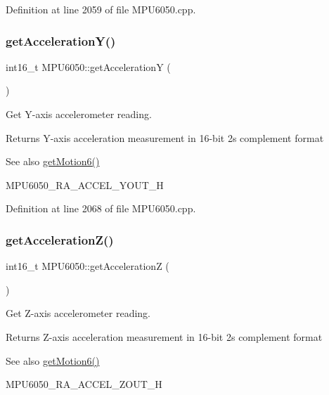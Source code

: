 Definition at line 2059 of file M\+P\+U6050.\+cpp.

\mbox{\label{classMPU6050_a27240b90d3e03c85b7a619b794bb1756}} 
\subsubsection{\texorpdfstring{getAccelerationY()}{getAccelerationY()}}
{\footnotesize\ttfamily int16\+\_\+t M\+P\+U6050\+::get\+AccelerationY (\begin{DoxyParamCaption}{ }\end{DoxyParamCaption})}



Get Y-\/axis accelerometer reading. 

\begin{DoxyReturn}{Returns}
Y-\/axis acceleration measurement in 16-\/bit 2\textquotesingle{}s complement format 
\end{DoxyReturn}
\begin{DoxySeeAlso}{See also}
\mbox{\hyperlink{classMPU6050_a574d3093dc131e4251a9b37adf208ca7}{get\+Motion6()}} 

M\+P\+U6050\+\_\+\+R\+A\+\_\+\+A\+C\+C\+E\+L\+\_\+\+Y\+O\+U\+T\+\_\+H 
\end{DoxySeeAlso}


Definition at line 2068 of file M\+P\+U6050.\+cpp.

\mbox{\label{classMPU6050_acf5f5a20c10d99a1bdedf139f897bfdf}} 
\subsubsection{\texorpdfstring{getAccelerationZ()}{getAccelerationZ()}}
{\footnotesize\ttfamily int16\+\_\+t M\+P\+U6050\+::get\+AccelerationZ (\begin{DoxyParamCaption}{ }\end{DoxyParamCaption})}



Get Z-\/axis accelerometer reading. 

\begin{DoxyReturn}{Returns}
Z-\/axis acceleration measurement in 16-\/bit 2\textquotesingle{}s complement format 
\end{DoxyReturn}
\begin{DoxySeeAlso}{See also}
\mbox{\hyperlink{classMPU6050_a574d3093dc131e4251a9b37adf208ca7}{get\+Motion6()}} 

M\+P\+U6050\+\_\+\+R\+A\+\_\+\+A\+C\+C\+E\+L\+\_\+\+Z\+O\+U\+T\+\_\+H 
\end{DoxySeeAlso}


